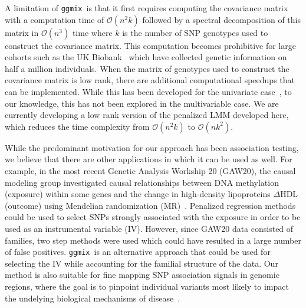 \documentclass[12pt,letter]{article}\usepackage[]{graphicx}\usepackage[]{color}
\newcommand{\ggmix}{\texttt{ggmix}}
\begin{document}

A limitation of \ggmix ~is that it first requires computing the covariance matrix with a computation time of $\mathcal{O}(n^2k)$ followed by a spectral decomposition of this matrix in $\mathcal{O}(n^3)$ time where $k$ is the number of SNP genotypes used to construct the covariance matrix. This computation becomes prohibitive for large cohorts such as the UK Biobank~\citep{allen2012uk} which have collected genetic information on half a million individuals. When the matrix of genotypes used to construct the covariance matrix is low rank, there are additional computational speedups that can be implemented. While this has been developed for the univariate case~\citep{lippert2011fast}, to our knowledge, this has not been explored in the multivariable case. We are currently developing a low rank version of the penalized LMM developed here, which reduces the time complexity from $\mathcal{O}(n^2k)$ to $\mathcal{O}(nk^2)$.




While the predominant motivation for our approach has been association testing, we believe that there are other applications in which it can be used as well.
For example, in the most recent Genetic Analysis Workship 20 (GAW20),  the causal modeling group investigated causal
relationships between DNA methylation (exposure) within some genes
and the change in high-density lipoproteins $\Delta$HDL (outcome) using Mendelian randomization (MR)~\citep{davey2003mendelian}.
Penalized regression methods could be used to select SNPs strongly associated with the exposure in order to be used as an instrumental variable (IV).
However, since GAW20 data consisted of families, two step methods were used which could have resulted in a large number of false positives. \ggmix~is an alternative approach that could be used for selecting the IV while accounting for the familial structure of the data.
Our method is also suitable for fine mapping SNP association signals in genomic regions, where the goal is to pinpoint individual variants most likely to impact the undelying biological mechanisms of disease~\citep{spain2015strategies}.
\end{document}

